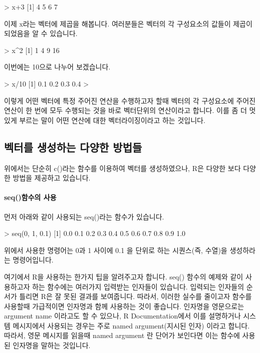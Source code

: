 \begin{Schunk}
\begin{Soutput}
> x+3
[1] 4 5 6 7	
\end{Soutput}
\end{Schunk}

이제 x라는 벡터에 제곱을 해봅니다. 
여러분들은 벡터의 각 구성요소의 값들이 제곱이 되었음을 알 수 있습니다. 
\begin{Schunk}
\begin{Soutput}
> x^2
[1]  1  4  9 16
\end{Soutput}
\end{Schunk}

이번에는 10으로 나누어 보겠습니다.

\begin{Schunk}
\begin{Soutput}
> x/10
[1] 0.1 0.2 0.3 0.4
> 
\end{Soutput}
\end{Schunk}

이렇게 어떤 벡터에 특정 주어진 연산을 수행하고자 할때 벡터의 각 구성요소에 주어진 연산이 한 번에 모두 수행되는 것을 바로 벡터단위의 연산이라고 합니다. 
이를 좀 더 멋있게 부르는 말이 어떤 연산에 대한 벡터라이징이라고 하는 것입니다. 


\subsection{벡터를 생성하는 다양한 방법들}

위에서는 단순히 c()라는 함수를 이용하여 벡터를 생성하였으나, R은 다양한 보다 다양한 방법을 제공하고 있습니다. 

\paragraph{seq()함수의 사용} 먼저 아래와 같이 사용되는 seq()라는 함수가 있습니다. 

\begin{Schunk}
\begin{Soutput}
> seq(0, 1, 0.1)
 [1] 0.0 0.1 0.2 0.3 0.4 0.5 0.6 0.7 0.8 0.9 1.0
\end{Soutput}
\end{Schunk}

위에서 사용한 명령어는 0과 1 사이에 0.1 을 단위로 하는 시퀀스(즉, 수열)을 생성하라는 명령어입니다. 

여기에서 R을 사용하는 한가지 팁을 알려주고자 합니다.
seq() 함수의 예제와 같이 사용하고자 하는 함수에는 여러가지 입력받는 인자들이 있습니다. 
입력되는 인자들의 순서가 틀리면 R은 잘 못된 결과를 보여줍니다. 
따라서, 이러한 실수를 줄이고자 함수를 사용할때 가급적이면 인자명과 함께 사용하는 것이 좋습니다.  
인자명을 영문으로는 argument name 이라고도 할 수 있으나, R Documentation에서 이를 설명하거나 시스템 메시지에서 사용되는 경우는 주로 named argument(지시된 인자) 이라고 합니다. 
따라서, 영문 메시지를 읽을때 named argument 란 단어가 보인다면 이는 함수에 사용된 인자명을 말하는 것입니다. 

